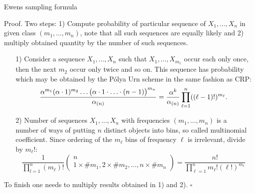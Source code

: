 \begin{frame}{Ewens sampling formula}

\alert{Proof.}
Two steps: 1) Compute probability of particular sequence of $X_1, \ldots, X_n$ in given class $(m_1,\ldots,m_n)$, note that all such sequences are equally likely and 2) multiply obtained quantity by the number of such sequences. 

\begin{itemize}
    \item[1)] Consider a sequence $X_1,\ldots, X_n$ such that $X_1, \ldots, X_{m_1}$ occur each only once, then the next $m_2$ occur only twice and so on. This sequence has probability which may be obtained by the P\'olya Urn scheme in the same fashion as CRP:
    \begin{equation*}
        \frac{\alpha^{m_1} (\alpha \cdot 1)^{m_2} \ldots \big( \alpha \cdot 1 \cdot\ldots \cdot (n-1) \big)^{m_n}  }{\alpha_{(n)}}=\frac{\alpha^k}{\alpha_{(n)}}\prod_{\ell=1}^n ((\ell-1)!)^{m_\ell}.
    \end{equation*}
    \item[2)] Number of sequences $X_1,\ldots,X_n$ with frequencies $(m_1, \ldots, m_n)$ is a number of ways of putting $n$ distinct objects into bins, so called multinomial coefficient. Since ordering of the $m_\ell$ bins of frequency $\ell$ is irrelevant,  divide by $m_\ell!$:
    \begin{equation*}
        \frac{1}{\prod_{l=1}^n (m_\ell)!}
        \begin{pmatrix}
n\\ 
1\times \# m_1, 2\times \# m_2, \ldots, n\times \# m_n
\end{pmatrix}
= \frac{n!}{\prod_{\ell=1}^n m_\ell!(\ell!)^{m_\ell}}
    \end{equation*}
\end{itemize}
To finish one needs to multiply results obtained in 1) and 2). \hfill $\square$
\end{frame}


